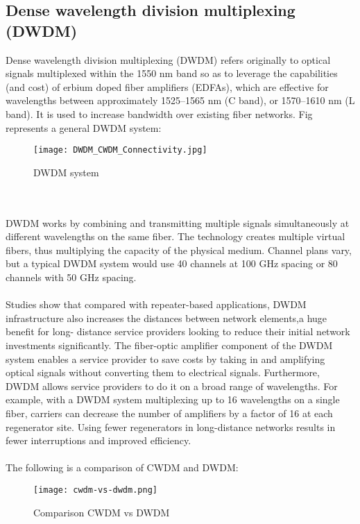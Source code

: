\documentclass[hidelinks, 12pt]{report}
\begin{document}
\subsection{Dense wavelength division multiplexing (DWDM)}
\justify
Dense wavelength division multiplexing (DWDM) refers originally to optical signals multiplexed within the 1550 nm band so as to leverage the capabilities (and cost) of erbium doped fiber amplifiers (EDFAs), which are effective for wavelengths between approximately 1525–1565 nm (C band), or 1570–1610 nm (L band). 
It is used to increase bandwidth over existing fiber networks.
Fig represents a general DWDM system:
\begin{figure}[H]
\centering
\texttt{[image: DWDM\_CWDM\_Connectivity.jpg]}
\caption[DWDM system]{DWDM system}
\label{DWDM system}
\end{figure}
\\ 
\\DWDM works by combining and transmitting multiple signals simultaneously at different wavelengths on the same fiber. The technology creates multiple virtual fibers, thus multiplying the capacity of the physical medium.
Channel plans vary, but a typical DWDM system would use 40 channels at 100 GHz spacing or 80 channels with 50 GHz spacing. \\
\\Studies show that compared with repeater-based applications,  DWDM infrastructure also 
increases the distances between network elements,a huge benefit for long-
distance service providers looking to reduce their initial network investments 
significantly. The fiber-optic amplifier component of the DWDM system enables 
a service provider to save costs by taking in and amplifying optical signals 
without converting them to electrical signals. Furthermore, DWDM allows 
service providers to do it on a broad range of wavelengths. 
For example, with a DWDM system multiplexing up to 16 wavelengths on a single 
fiber, carriers can decrease the number of amplifiers by a factor of 16 at each 
regenerator site. Using fewer regenerators in long-distance networks results in 
fewer interruptions and improved efficiency. \\ 
\\The following is a comparison of CWDM and DWDM:
\begin{figure}[H]
\centering
\texttt{[image: cwdm-vs-dwdm.png]}
\caption[Comparison CWDM vs DWDM]{Comparison CWDM vs DWDM}
\label{Comparison CWDM vs DWDM}
\end{figure}
\end{document}
